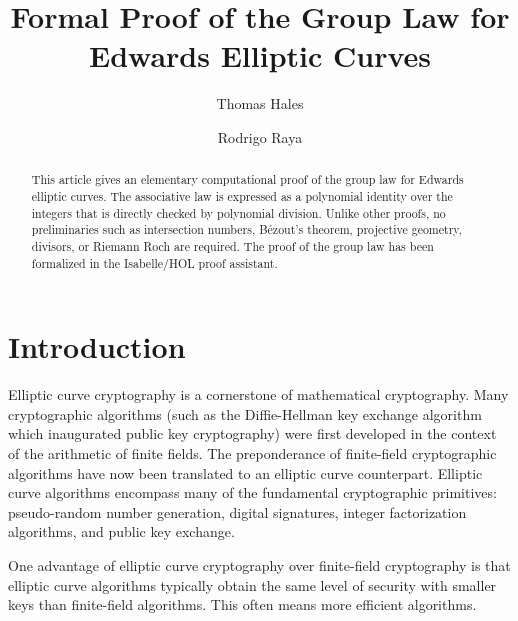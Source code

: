 \documentclass{llncs}
\title{Formal Proof of the Group Law for Edwards Elliptic Curves}
\author{Thomas Hales\inst{1}\and Rodrigo Raya\inst{2}}
\date{}
\institute{University of Pittsburgh\and Technical University of Munich}
\begin{document}
\maketitle

\begin{abstract} 
  This article gives an elementary computational proof of the group
  law for Edwards elliptic curves. The associative law is expressed as
  a polynomial identity over the integers that is directly checked by
  polynomial division.  Unlike other proofs, no preliminaries such as
  intersection numbers, B\'ezout's theorem, projective geometry,
  divisors, or Riemann Roch are required.  The proof of the group law
  has been formalized in the Isabelle/HOL proof assistant.
\end{abstract}

\baselineskip
{}\baselineskip

\newenvironment{blockquote}{%
  \par%
  \medskip%
  \baselineskip=0.7\baselineskip%
  \leftskip=2em\rightskip=2em%
  \noindent\ignorespaces}{%
  \par\medskip}


\section{Introduction}

Elliptic curve cryptography is a cornerstone of mathematical
cryptography.  Many cryptographic algorithms (such as the
Diffie-Hellman key exchange algorithm which inaugurated public key
cryptography) were first developed in the context of the arithmetic of
finite fields.  The preponderance of finite-field cryptographic
algorithms have now been translated to an elliptic curve counterpart.
Elliptic curve algorithms encompass many of the fundamental
cryptographic primitives: pseudo-random number generation, digital
signatures, integer factorization algorithms, and public key exchange.

One advantage of elliptic curve cryptography over finite-field
cryptography is that elliptic curve algorithms typically obtain the same
level of security with smaller keys than finite-field algorithms.
This often means more efficient algorithms.
\end{document}
